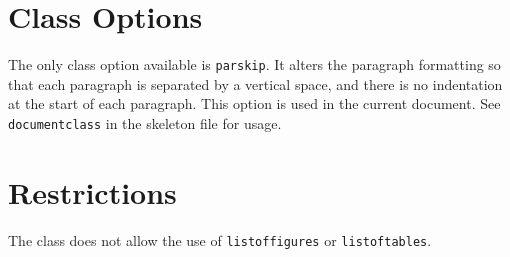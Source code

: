 \section{Class Options}

The only class option available is {\tt parskip}.
It alters the paragraph formatting so that each paragraph is separated by
a vertical space, and there is no indentation at the start of each
paragraph. 
This option is used in the current document.
See {\tt documentclass} in the skeleton file for usage. 

\section{Restrictions}

The class does not allow the use of {\tt listoffigures} or {\tt listoftables}.
